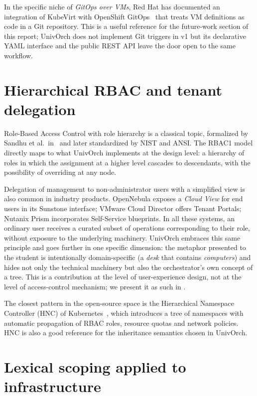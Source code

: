 In the specific niche of \emph{GitOps over VMs}, Red Hat has
documented an integration of KubeVirt with OpenShift
GitOps~\cite{kubevirt-gitops} that treats VM definitions as code in a
Git repository. This is a useful reference for the future-work
section of this report; UnivOrch does not implement Git triggers in
v1 but its declarative YAML interface and the public REST API leave
the door open to the same workflow.

\section{Hierarchical RBAC and tenant delegation}
\label{sec:rbac}

Role-Based Access Control with role hierarchy is a classical topic,
formalized by Sandhu et al.\ in~\cite{sandhu1996rbac} and later
standardized by NIST and ANSI. The RBAC1
model directly maps to what UnivOrch implements at the design level:
a hierarchy of roles in which the assignment at a higher level
cascades to descendants, with the possibility of overriding at any
node.

Delegation of management to non-administrator users with a
simplified view is also common in industry products. OpenNebula
exposes a \emph{Cloud View} for end users in its Sunstone interface;
VMware Cloud Director offers Tenant Portals; Nutanix Prism
incorporates Self-Service blueprints. In all these systems, an
ordinary user receives a curated subset of operations corresponding
to their role, without exposure to the underlying machinery. UnivOrch
embraces this same principle and goes further in one specific
dimension: the metaphor presented to the student is intentionally
domain-specific (a \emph{desk} that contains \emph{computers}) and
hides not only the technical machinery but also the orchestrator's
own concept of a tree. This is a contribution at the level of
user-experience design, not at the level of access-control
mechanism; we present it as such in .

The closest pattern in the open-source space is the Hierarchical
Namespace Controller (HNC) of Kubernetes~\cite{k8s-hnc-blog}, which
introduces a tree of namespaces with automatic propagation of RBAC
roles, resource quotas and network policies. HNC is also a good
reference for the inheritance semantics chosen in UnivOrch.

\section{Lexical scoping applied to infrastructure}
\label{sec:lexical}

